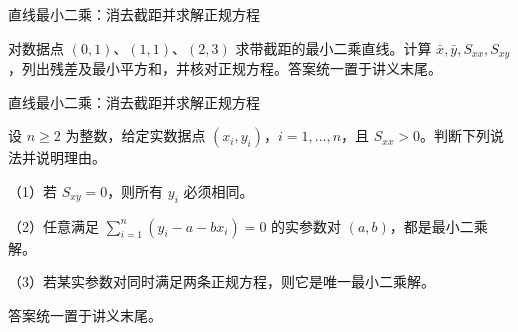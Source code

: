 \documentclass[aspectratio=169,10pt,fontset=fandol]{ctexbeamer}
\begin{document}
\begin{frame}[t,fragile]{直线最小二乘：消去截距并求解正规方程}
\normalsize
{\normalsize
\begin{exercise}
\label{mathagent:exercise:332ae2e99c79cf97370ba4732967ff23f2a2c4a4b36b98eda8e910755bf43b8b}
对数据点 $(0,1)$、$(1,1)$、$(2,3)$ 求带截距的最小二乘直线。计算 $\bar{x},\bar{y},S_{xx},S_{xy}$，列出残差及最小平方和，并核对正规方程。答案统一置于讲义末尾。
\end{exercise}
}
\end{frame}
\begin{frame}[t,fragile]{直线最小二乘：消去截距并求解正规方程}
\normalsize
{\normalsize
\begin{exercise}
\label{mathagent:exercise:b4c9c9a1fb82bcef052fdbf6e1539831ed88cee016dbcbf83a50e5e8d2311be0}
设 $n\geq2$ 为整数，给定实数据点 $(x_i,y_i)$，$i=1,\ldots,n$，且 $S_{xx}>0$。判断下列说法并说明理由。

（1）若 $S_{xy}=0$，则所有 $y_i$ 必须相同。

（2）任意满足 $\sum_{i=1}^{n}(y_i-a-bx_i)=0$ 的实参数对 $(a,b)$，都是最小二乘解。

（3）若某实参数对同时满足两条正规方程，则它是唯一最小二乘解。

答案统一置于讲义末尾。
\end{exercise}
}
\end{frame}
\end{document}

